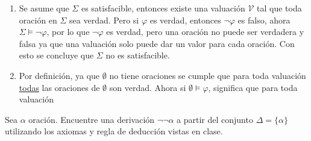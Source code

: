 \begin{sol}
    \begin{enumerate}[label=(\alph*)]
        \item Se asume que $\Sigma$ es satisfacible, entonces existe una valuación $\mathcal{V}$ tal que toda oración en $\Sigma$ sea verdad. Pero si $\varphi$ es verdad, entonces $\neg\varphi$ es falso, ahora $\Sigma\models\neg\varphi$, por lo que $\neg\varphi$ es verdad, pero una oración no puede ser verdadera y falsa ya que una valuación solo puede dar un valor para cada oración. Con esto se concluye que $\Sigma$ no es satisfacible.
        \item Por definición, ya que $\emptyset$ no tiene oraciones se cumple que para toda valuación \underline{todas} las oraciones de $\emptyset$ son verdad. Ahora si $\emptyset\models\varphi$, significa que para toda valuación
    \end{enumerate}
\end{sol}

\begin{prob}[5 pts]
    Sea $\alpha$ oración. Encuentre una derivación $\neg \neg \alpha$ a partir del conjunto $\Delta=\{\alpha\}$ utilizando los axiomas y regla de deducción vistas en clase.
\end{prob}

